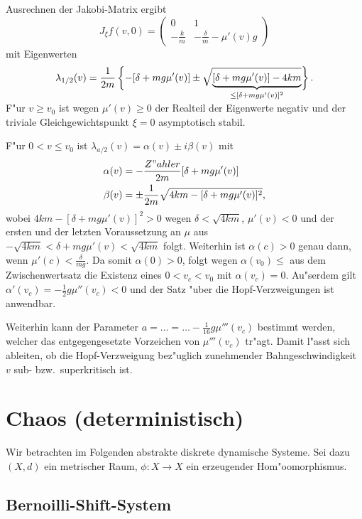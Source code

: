 \documentclass[a4paper, 13pt]{scrreprt}
\theoremstyle{definition} \newtheorem{definition}{Definition}[section]
\newenvironment{beispiel}[1][Beispiel]{\begin{trivlist}
\item[\hskip \labelsep {\bfseries #1}]}{\end{trivlist}}
\begin{document}
\begin{beispiel}[Reibschwinger aus der Mechanik]
Ausrechnen der Jakobi-Matrix ergibt
\[
J_\xi f(v,0)=\begin{pmatrix}
0 & 1\\
-\frac{k}{m} & -\frac{\delta}{m}-\mu'(v)g
\end{pmatrix}
\]
mit Eigenwerten
\[
\lambda_{1\slash2}(v)=\frac{1}{2m}\left\{-[\delta+mg\mu'(v)]\pm\sqrt{\vphantom{[\delta+mg\mu'(v)]-4km}\smash{\underbrace{[\delta+mg\mu'(v)]-4km}_{\leq[\delta+mg\mu'(v)]^2}}}\right\}.
\]

F"ur $v\geq v_0$ ist wegen $\mu'(v)\geq0$ der Realteil der Eigenwerte negativ und der triviale Gleichgewichtspunkt $\xi=0$ asymptotisch stabil.

F"ur $0<v\leq v_0$ ist $\lambda_{a\slash 2}(v)=\alpha(v)\pm i\beta(v)$ mit
\begin{align*}
\alpha(v)&=-\frac{Z"ahler}{2m}[\delta+mg\mu'(v)]\\
\beta(v)&=\pm\frac{1}{2m}\sqrt{4km-[\delta+mg\mu'(v)]^2},
\end{align*}
wobei $4km-[\delta+mg\mu'(v)]^2>0$ wegen $\delta<\sqrt{4km}$, $\mu'(v)<0$ und der ersten und der letzten Voraussetzung an $\mu$ aus $-\sqrt{4km}<\delta+mg\mu'(v)<\sqrt{4km}$ folgt. Weiterhin ist $\alpha(c)>0$ genau dann, wenn $\mu'(c)<\frac{\delta}{mg}$. Da somit $\alpha(0)>0$, folgt wegen $\alpha(v_0)\leq$ aus dem Zwischenwertsatz die Existenz eines $0<v_c<v_0$ mit $\alpha(v_c)=0$. Au"serdem gilt $\alpha'(v_c)=-\frac{1}{2}g\mu''(v_c)<0$ und der Satz "uber die Hopf-Verzweigungen ist anwendbar.

Weiterhin kann der Parameter $a=\ldots=\ldots-\frac{1}{16}g\mu'''(v_c)$ bestimmt werden, welcher das entgegengesetzte Vorzeichen von $\mu'''(v_c)$ tr"agt. Damit l"asst sich ableiten, ob die Hopf-Verzweigung bez"uglich zunehmender Bahngeschwindigkeit $v$ sub- bzw.\ superkritisch ist. 
\end{beispiel}


\chapter{Chaos (deterministisch)}

Wir betrachten im Folgenden abstrakte diskrete dynamische Systeme. Sei dazu
\((X,d)\) ein metrischer Raum, \(\phi:X\to X \) ein erzeugender Hom"oomorphismus.

\section{Bernoilli-Shift-System}
\end{document}
